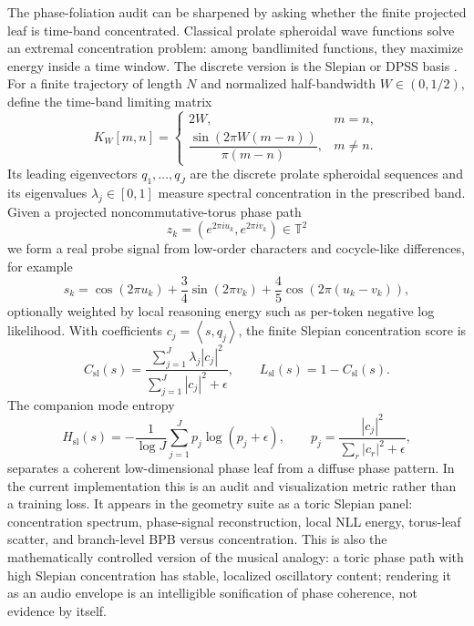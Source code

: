 \documentclass[11pt]{article}
\theoremstyle{definition}
\theoremstyle{plain}
\theoremstyle{remark}
\numberwithin{equation}{section}
\newcommand{\ip}[2]{\left\langle #1,#2\right\rangle}
\begin{document}
The phase-foliation audit can be sharpened by asking whether the finite projected leaf is time-band concentrated.  Classical prolate spheroidal wave functions solve an extremal concentration problem: among bandlimited functions, they maximize energy inside a time window.  The discrete version is the Slepian or DPSS basis \cite{slepian1978prolate}.  For a finite trajectory of length $N$ and normalized half-bandwidth $W\in(0,1/2)$, define the time-band limiting matrix
\begin{equation}
  K_W[m,n]=
  \begin{cases}
    2W, & m=n,\\[0.35em]
    \dfrac{\sin(2\pi W(m-n))}{\pi(m-n)}, & m\ne n.
  \end{cases}
\end{equation}
Its leading eigenvectors $q_1,\ldots,q_J$ are the discrete prolate spheroidal sequences and its eigenvalues $\lambda_j\in[0,1]$ measure spectral concentration in the prescribed band.  Given a projected noncommutative-torus phase path
\begin{equation}
  z_k=\left(e^{2\pi i u_k},e^{2\pi i v_k}\right)\in\mathbb T^2
\end{equation}
we form a real probe signal from low-order characters and cocycle-like differences, for example
\begin{equation}
  s_k=\cos(2\pi u_k)+\frac34\sin(2\pi v_k)+\frac45\cos(2\pi(u_k-v_k)),
\end{equation}
optionally weighted by local reasoning energy such as per-token negative log likelihood.  With coefficients $c_j=\ip{s}{q_j}$, the finite Slepian concentration score is
\begin{equation}
  C_{\mathrm{sl}}(s)=
  \frac{\sum_{j=1}^J\lambda_j |c_j|^2}{\sum_{j=1}^J |c_j|^2+\epsilon},
  \qquad
  L_{\mathrm{sl}}(s)=1-C_{\mathrm{sl}}(s).
\end{equation}
The companion mode entropy
\begin{equation}
  H_{\mathrm{sl}}(s)=
  -\frac{1}{\log J}\sum_{j=1}^J p_j\log(p_j+\epsilon),
  \qquad p_j=\frac{|c_j|^2}{\sum_r |c_r|^2+\epsilon},
\end{equation}
separates a coherent low-dimensional phase leaf from a diffuse phase pattern.  In the current implementation this is an audit and visualization metric rather than a training loss.  It appears in the geometry suite as a toric Slepian panel: concentration spectrum, phase-signal reconstruction, local NLL energy, torus-leaf scatter, and branch-level BPB versus concentration.  This is also the mathematically controlled version of the musical analogy: a toric phase path with high Slepian concentration has stable, localized oscillatory content; rendering it as an audio envelope is an intelligible sonification of phase coherence, not evidence by itself.
\end{document}
